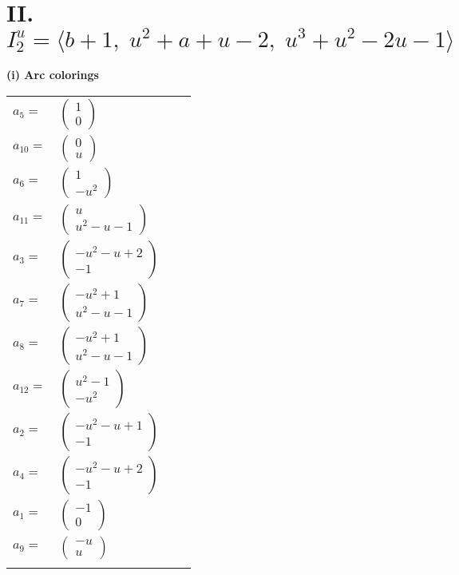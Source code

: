 \documentclass[1p]{elsarticle_modified}
\theoremstyle{definition}
\begin{document}
\centering \section*{II. $I^u_{2}= \langle b+1,\;u^2+a+u-2,\;u^3+u^2-2 u-1 \rangle$}
\flushleft \textbf{(i) Arc colorings}\\
\begin{tabular}{m{7pt} m{180pt} m{7pt} m{180pt} }
\flushright $a_{5}=$&$\begin{pmatrix}1\\0\end{pmatrix}$ \\
\flushright $a_{10}=$&$\begin{pmatrix}0\\u\end{pmatrix}$ \\
\flushright $a_{6}=$&$\begin{pmatrix}1\\- u^2\end{pmatrix}$ \\
\flushright $a_{11}=$&$\begin{pmatrix}u\\u^2- u-1\end{pmatrix}$ \\
\flushright $a_{3}=$&$\begin{pmatrix}- u^2- u+2\\-1\end{pmatrix}$ \\
\flushright $a_{7}=$&$\begin{pmatrix}- u^2+1\\u^2- u-1\end{pmatrix}$ \\
\flushright $a_{8}=$&$\begin{pmatrix}- u^2+1\\u^2- u-1\end{pmatrix}$ \\
\flushright $a_{12}=$&$\begin{pmatrix}u^2-1\\- u^2\end{pmatrix}$ \\
\flushright $a_{2}=$&$\begin{pmatrix}- u^2- u+1\\-1\end{pmatrix}$ \\
\flushright $a_{4}=$&$\begin{pmatrix}- u^2- u+2\\-1\end{pmatrix}$ \\
\flushright $a_{1}=$&$\begin{pmatrix}-1\\0\end{pmatrix}$ \\
\flushright $a_{9}=$&$\begin{pmatrix}- u\\u\end{pmatrix}$\\&\end{tabular}
\end{document}
